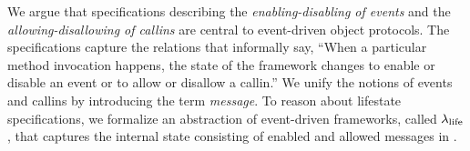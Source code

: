 \documentclass[10pt,reprint,nocopyrightspace,numbers]{sigplanconf}
\begin{document}
We argue that specifications describing the \emph{enabling-disabling of events} and the \emph{allowing-disallowing of callins} are central to event-driven object protocols.
%
The specifications capture the relations that informally say, ``When a particular method
invocation happens, the state of the framework changes to enable or
disable an event or to allow or disallow a callin.''
%
%
We unify the notions of events and callins by introducing the term \emph{message}.
To reason about lifestate specifications,
we formalize an abstraction of event-driven frameworks, called
$\lambda_{\text{life}}$, that captures the internal state consisting of enabled and
allowed messages in .
\end{document}

